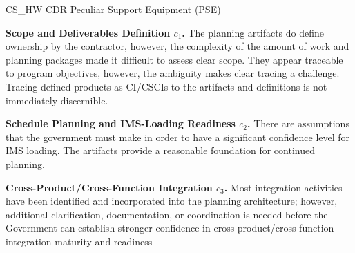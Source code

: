 \begin{frame}{CS\_HW CDR Peculiar Support Equipment (PSE)}
\begin{minipage}{0.90\textwidth}
\raggedright
\fontsize{8}{9.5}\selectfont
\textbf{Scope and Deliverables Definition \(c_1\).}
The planning artifacts do define ownership by the contractor, however, the complexity of the amount of work and planning packages made it difficult to assess clear scope. They appear traceable to program objectives, however, the ambiguity makes clear tracing a challenge. Tracing defined products as CI/CSCIs to the artifacts and definitions is not immediately discernible.\par\vspace{0.6em}
\textbf{Schedule Planning and IMS-Loading Readiness \(c_2\).}
There are assumptions that the government must make in order to have a significant confidence level for IMS loading. The artifacts provide a reasonable foundation for continued planning.\par\vspace{0.6em}
\textbf{Cross-Product/Cross-Function Integration \(c_3\).}
Most integration activities have been identified and incorporated into the planning architecture; however, additional clarification, documentation, or coordination is needed before the Government can establish stronger confidence in cross-product/cross-function integration maturity and readiness\par\vspace{0.6em}
\end{minipage}
\end{frame}

\endinput
